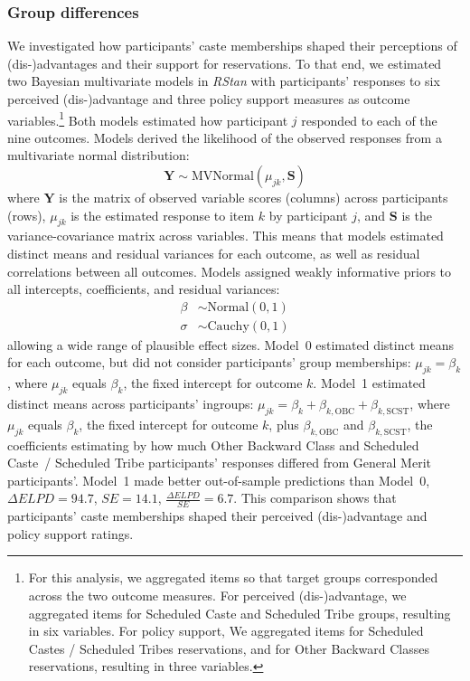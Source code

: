 \documentclass[12pt, a4paper]{article}
\begin{document}
\subsubsection{Group differences}

We investigated how participants' caste memberships shaped their perceptions of (dis-)advantages and their support for reservations. To that end, we estimated two Bayesian multivariate models in \emph{RStan} \cite{rstan_package} with participants' responses to six perceived (dis-)advantage and three policy support measures as outcome variables.\footnote{For this analysis, we aggregated items so that target groups corresponded across the two outcome measures. For perceived (dis-)advantage, we aggregated items for Scheduled Caste and Scheduled Tribe groups, resulting in six variables. For policy support, We aggregated items for Scheduled Castes / Scheduled Tribes reservations, and for Other Backward Classes reservations, resulting in three variables.} Both models estimated how participant $j$ responded to each of the nine outcomes. Models derived the likelihood of the observed responses from a multivariate normal distribution: $$ \textbf{Y} \sim \text{MVNormal} (\mu_{jk}, \textbf{S} ) $$ where $\textbf{Y}$ is the matrix of observed variable scores (columns) across participants (rows), $\mu_{jk}$ is the estimated response to item $k$ by participant $j$, and $\textbf{S}$ is the variance-covariance matrix across variables. This means that models estimated distinct means and residual variances for each outcome, as well as residual correlations between all outcomes. Models assigned weakly informative priors to all intercepts, coefficients, and residual variances: 
\begin{align*} 
\beta & \sim \text{Normal} (0, 1) \\ 
\sigma & \sim \text{Cauchy} (0, 1)
\end{align*}
allowing a wide range of plausible effect sizes. Model~0 estimated distinct means for each outcome, but did not consider participants' group memberships: $ \mu_{jk} =  \beta_k $, where $\mu_{jk}$ equals $\beta_{k}$, the fixed intercept for outcome $k$. Model~1 estimated distinct means across participants' ingroups: $ \mu_{jk} =  \beta_k + \beta_{k,\text{OBC}} + \beta_{k,\text{SCST}} $, where $\mu_{jk}$ equals $\beta_k$, the fixed intercept for outcome $k$, plus $\beta_{k,\text{OBC}}$ and $\beta_{k,\text{SCST}}$, the coefficients estimating by how much Other Backward Class and Scheduled Caste~/ Scheduled Tribe participants' responses differed from General Merit participants'. Model~1 made better out-of-sample predictions than Model~0, $\Delta\textit{ELPD} = 94.7$, $SE = 14.1$, $\frac{\Delta\textit{ELPD}}{\textit{SE}} = 6.7$. This comparison shows that participants' caste memberships shaped their perceived (dis-)advantage and policy support ratings. 
\end{document}
